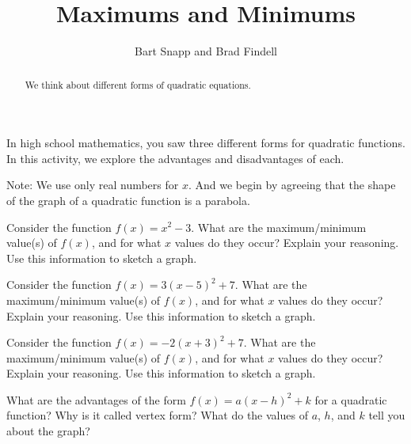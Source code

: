 \documentclass[nooutcomes]{ximera}
\title{Maximums and Minimums}
\author{Bart Snapp and Brad Findell}
\begin{document}
\begin{abstract}
  We think about different forms of quadratic equations.
\end{abstract}
\maketitle

\label{A:vertex}


%
%

  

In high school mathematics, you saw three different forms for quadratic functions.  In this activity, we explore the advantages and disadvantages of each.  

Note:  We use only real numbers for $x$.  And we begin by agreeing that the shape of the graph of a quadratic function is a parabola.  

\begin{problem}
Consider the function $f(x) = x^2 -3$. What are the maximum/minimum value(s) of $f(x)$, and for what $x$ values do they occur? 
Explain your reasoning.  Use this information to sketch a graph.  
\end{problem}

\begin{problem}
Consider the function $f(x) = 3(x-5)^2 +7$. What are the maximum/minimum value(s) of $f(x)$, and for what $x$ values do they occur? Explain your reasoning.  Use this information to sketch a graph.  
\end{problem}

\begin{problem}
Consider the function $f(x) = -2(x+3)^2 + 7$. What are the maximum/minimum value(s) of $f(x)$, and for what $x$ values do they occur? Explain your reasoning.  Use this information to sketch a graph.  
\end{problem}

\begin{problem}
What are the advantages of the form $f(x) = a(x-h)^2+k$ for a quadratic function?  Why is it called vertex form?  What do the values of $a$, $h$, and $k$ tell you about the graph?  
\end{problem}
\end{document}

